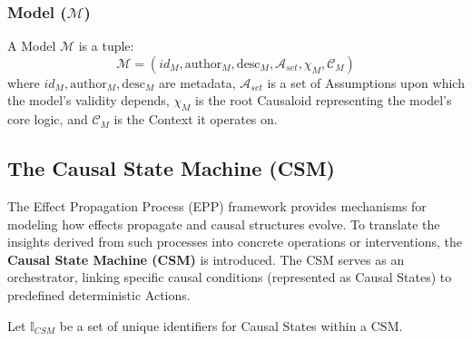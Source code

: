\subsubsection{Model (\(\mathcal{M}\))}

\begin{definition}[Model]
\label{def:epp_model}  
A Model \(\mathcal{M}\) is a tuple:
\[ \mathcal{M} = (id_M, \text{author}_M, \text{desc}_M, \mathcal{A}_{set}, \chi_M, \mathcal{C}_M) \]
where \(id_M, \text{author}_M, \text{desc}_M\) are metadata, \(\mathcal{A}_{set}\) is a set of Assumptions upon which the model's validity depends, \(\chi_M\) is the root Causaloid representing the model's core logic, and \(\mathcal{C}_M\) is the Context it operates on.
 \end{definition}   
 

\subsection[The Causal State Machine (CSM) ]{The Causal State Machine (CSM)}
\label{sec:formalization_csm}

The Effect Propagation Process (EPP) framework provides mechanisms for modeling how effects propagate and causal structures evolve. To translate the insights derived from such processes into concrete operations or interventions, the \textbf{Causal State Machine (CSM)} is introduced. The CSM serves as an orchestrator, linking specific causal conditions (represented as Causal States) to predefined deterministic Actions. 

Let \(\mathbb{I}_{CSM}\) be a set of unique identifiers for Causal States within a CSM.

